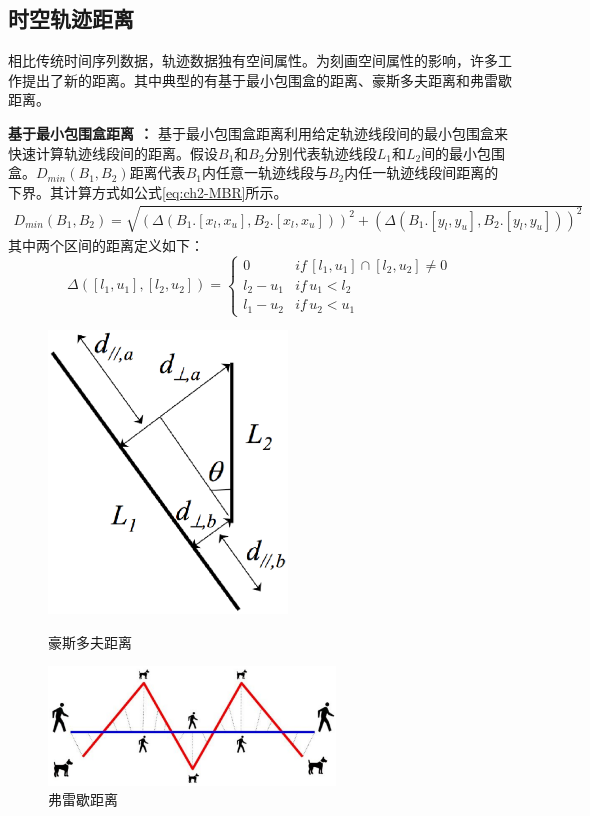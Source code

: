 \subsection{时空轨迹距离}
相比传统时间序列数据，轨迹数据独有空间属性。为刻画空间属性的影响，许多工作提出了新的距离。其中典型的有基于最小包围盒的距离、豪斯多夫距离和弗雷歇距离。

\textbf{基于最小包围盒距离 ：}
基于最小包围盒距离利用给定轨迹线段间的最小包围盒来快速计算轨迹线段间的距离。假设$B_{1}$和$B_{2}$分别代表轨迹线段$L_{1}$和$L_{2}$间的最小包围盒。$D_{min}(B_{1},B_{2})$距离代表$B_{1}$内任意一轨迹线段与$B_{2}$内任一轨迹线段间距离的下界。其计算方式如公式\ref{eq:ch2-MBR}所示。
\begin{eqnarray}\label{eq:ch2-MBR}
D_{min}(B_{1},B_{2})=\sqrt{(\Delta(B_{1}.[x_{l}, x_{u}], B_{2}.[x_{l},x_{u}])  )^2+(\Delta(B_{1}.[y_{l}, y_{u}], B_{2}.[y_{l},y_{u}]) )^2 }
\end{eqnarray}
其中两个区间的距离定义如下：
\begin{equation}\label{eq:ch2-DisInternal}
\Delta([l_{1}, u_{1}], [l_{2},u_{2}]) =\begin{cases}
0 & if \, [l_{1}, u_{1}] \cap [l_{2},u_{2}] \neq 0   \\
l_{2}-u_{1} & if \, u_{1} < l_{2}   \\
l_{1}-u_{2} & if \, u_2 < u_{1}
\end{cases}
\end{equation}


\begin{figure}[t]
	\begin{minipage}[t]{0.5\linewidth}
		\centering
		\includegraphics[width=2.5in]{Fig/chapter2/Hausdorff}
		\caption{豪斯多夫距离}
		\label{fig-chapter2-Hausdorff}
	\end{minipage}%
	\hfill
	\begin{minipage}[t]{0.5\linewidth}
		\centering
		\includegraphics[width=3in]{Fig/chapter2/dogpeople}
		\caption{弗雷歇距离}
		\label{fig-chapter2-Frechet}
	\end{minipage}
\end{figure}

